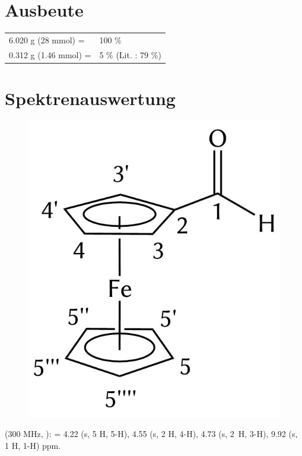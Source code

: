 \documentclass[12pt]{article}
\begin{document}
\begin{onehalfspace}
\section{Ausbeute}
\begin{tabular}{ll}
  6.020 \si{\gram} (28 \si{\milli\mol}) =  & 100 \%\\
  0.312 \si{\gram} (1.46 \si{\milli\mol}) =  & 5 \% (Lit.\cite{bio} : 79 \%) \\
\end{tabular}
\newpage
\section{Spektrenauswertung}
\begin{figure}[!ht]
   \centering
\includegraphics[scale=0.3]{auswert.png}
\end{figure}
\noindent
\textbf{} (300 MHz, ): \ce{$\delta$} = 
4.22 (s, 5 H, 5-H),
4.55 (s, 2 H, 4-H),
4.73 (s, 2~H, 3-H),
9.92 (s, 1 H, 1-H) ppm.

\end{onehalfspace}
\end{document}
